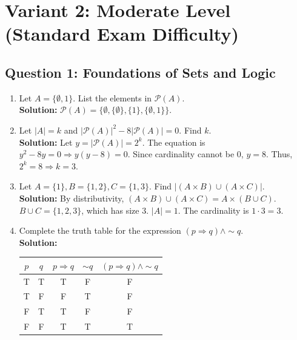 \documentclass[11pt]{article}
\begin{document}
\newpage
\section{Variant 2: Moderate Level (Standard Exam Difficulty)}

\subsection*{Question 1: Foundations of Sets and Logic}
\begin{enumerate}[label=(\roman*)]
    \item Let $A = \{\emptyset, 1\}$. List the elements in $\mathcal{P}(A)$.\\
    \textbf{Solution:} $\mathcal{P}(A) = \{\emptyset, \{\emptyset\}, \{1\}, \{\emptyset, 1\}\}$.

    \item Let $|A| = k$ and $|\mathcal{P}(A)|^2 - 8|\mathcal{P}(A)| = 0$. Find $k$.\\
    \textbf{Solution:} Let $y = |\mathcal{P}(A)| = 2^k$. The equation is $y^2 - 8y = 0 \Rightarrow y(y-8) = 0$. Since cardinality cannot be 0, $y = 8$. Thus, $2^k = 8 \Rightarrow k = 3$.

    \item Let $A = \{1\}, B = \{1, 2\}, C = \{1, 3\}$. Find $|(A \times B) \cup (A \times C)|$.\\
    \textbf{Solution:} By distributivity, $(A \times B) \cup (A \times C) = A \times (B \cup C)$. \\
    $B \cup C = \{1, 2, 3\}$, which has size 3. $|A| = 1$. The cardinality is $1 \cdot 3 = 3$.

    \item Complete the truth table for the expression $(p \Rightarrow q) \wedge \sim q$.\\
    \textbf{Solution:}
    \begin{center}
    \begin{tabular}{|c|c|c|c|c|}
    \hline
    $p$ & $q$ & $p \Rightarrow q$ & $\sim q$ & $(p \Rightarrow q) \wedge \sim q$ \\
    \hline
    T & T & T & F & F \\
    T & F & F & T & F \\
    F & T & T & F & F \\
    F & F & T & T & T \\
    \hline
    \end{tabular}
    \end{center}


\end{enumerate}
\end{document}

